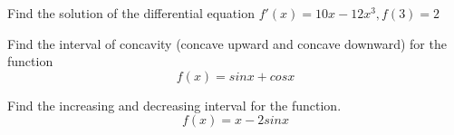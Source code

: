 \documentclass[11pt]{exam}
\begin{document}
\begin{questions}


\vspace{8cm}
\addpoints
\question[10] Find the solution of the differential equation $f'(x)=10x-12x^3, f(3)=2$


\vspace{8cm}
\addpoints
\question[10] Find the interval of concavity (concave upward and concave downward) for the function 
\[f(x)=sinx+cosx\]


\vspace{8cm}
\noaddpoints
\question[5 Bonus] Find the increasing and decreasing interval for the function.\[f(x)=x-2sinx\]
\end{questions}
\end{document}
